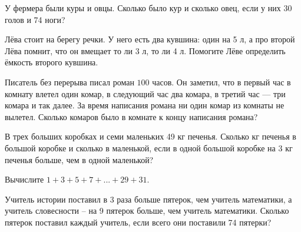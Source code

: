 \begin{consultation}
	\begin{listofex}
	\item У фермера были куры и овцы. Сколько было кур и сколько овец, если у
	них 30 голов и 74 ноги?
	\item Лёва стоит на берегу речки. У него есть два кувшина: один на 5 л, а про второй Лёва помнит, что он вмещает то ли 3 л, то ли 4 л. Помогите Лёве определить ёмкость второго
	кувшина.
	\item Писатель без перерыва писал роман \( 100 \) часов. Он заметил, что в первый час в комнату влетел один комар, в следующий час два комара, в третий час --- три комара и так далее. За время написания романа ни один комар из комнаты не вылетел. Сколько комаров было в комнате к концу написания романа?
	\item В трех больших коробках и семи маленьких 49 кг печенья. Сколько кг печенья в большой коробке и сколько в маленькой, если в одной большой коробке на 3 кг печенья больше, чем в
	одной маленькой?
	\item Вычислите \( 1+3+5+7+...+29+31 \).
	\item Учитель истории поставил в 3 раза больше пятерок, чем учитель математики, а учитель
	словесности – на 9 пятерок больше, чем учитель математики. Сколько пятерок поставил
	каждый учитель, если всего они поставили 74 пятерки?
\end{listofex}
\end{consultation}
